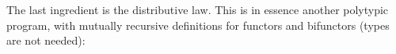 \documentclass[fleqn,runningheads]{llncs}
\begin{document}
\begin{AgdaAlign}
The last ingredient is the distributive law. This is in essence another polytypic program, with mutually recursive definitions for functors and bifunctors (types are not needed):
\begin{code}%
%
\>[2]%
\>[10]\AgdaSymbol{:}\AgdaSpace{}%
\AgdaSymbol{(}\AgdaSpace{}%
\AgdaSymbol{:}\AgdaSpace{}%
\AgdaSymbol{)}%
\>[29]\AgdaSpace{}%
\AgdaOperator{\AgdaFunction{[[}}\AgdaSpace{}%
\AgdaSpace{}%
\AgdaOperator{\AgdaFunction{]]F}}%
\>[41]\AgdaSymbol{(}\AgdaSpace{}%
\AgdaSymbol{)}%
\>[54]\AgdaSpace{}%
\AgdaSpace{}%
\AgdaSymbol{(}\AgdaOperator{\AgdaFunction{[[}}\AgdaSpace{}%
\AgdaSpace{}%
\AgdaOperator{\AgdaFunction{]]F}}%
\>[69]\AgdaSymbol{)}\<%
\\
%
\>[2]%
\>[10]\AgdaSymbol{:}\AgdaSpace{}%
\AgdaSymbol{(}\AgdaSpace{}%
\AgdaSymbol{:}\AgdaSpace{}%
\AgdaSymbol{)}%
\>[29]\AgdaSpace{}%
\AgdaOperator{\AgdaFunction{[[}}\AgdaSpace{}%
\AgdaSpace{}%
\AgdaOperator{\AgdaFunction{]]B}}%
\>[41]\AgdaSymbol{(}\AgdaSpace{}%
\AgdaSymbol{)}\AgdaSpace{}%
\AgdaSymbol{(}\AgdaSpace{}%
\AgdaSymbol{)}%
\>[54]\AgdaSpace{}%
\AgdaSpace{}%
\AgdaSymbol{(}\AgdaOperator{\AgdaFunction{[[}}\AgdaSpace{}%
\AgdaSpace{}%
\AgdaOperator{\AgdaFunction{]]B}}%
\>[69]\AgdaSpace{}%
\AgdaSymbol{)}\<%
\\
%
\\[\AgdaEmptyExtraSkip]%
%
\>[2]\AgdaSpace{}%
\AgdaSymbol{(}\AgdaSpace{}%
\AgdaSymbol{)}\AgdaSpace{}%
\AgdaSymbol{(}\AgdaSpace{}%
\AgdaSymbol{)}%
\>[28]\AgdaSymbol{=}\AgdaSpace{}%
\AgdaSpace{}%
\AgdaOperator{\AgdaPostulate{<\$>}}\AgdaSpace{}%
\AgdaSymbol{(}\AgdaSpace{}%
\AgdaSpace{}%
\AgdaSymbol{(}\AgdaSpace{}%
\AgdaSpace{}%
\AgdaSpace{}%
\AgdaSymbol{(}\AgdaSpace{}%
\AgdaSymbol{(}\AgdaSpace{}%
\AgdaSymbol{)}\AgdaSpace{}%
\AgdaSymbol{)}\AgdaSpace{}%
\AgdaSymbol{))}\<%
\\
%
\\[\AgdaEmptyExtraSkip]%

\end{code}
\end{AgdaAlign}
\end{document}
